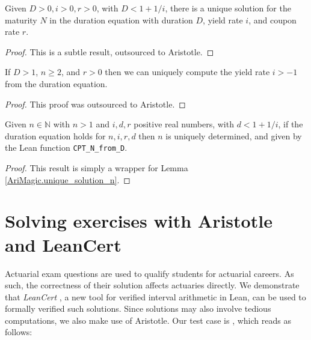 \begin{lemma}\label{AriMagic.unique_solution_n}
	\leanok
	Given $D>0, i>0, r>0$, with $D < 1 + 1/i$, there is a unique solution for the maturity $N$
	in the duration equation with duration $D$, yield rate $i$, and coupon rate $r$.
\end{lemma}
\begin{proof}
	\leanok
	This is a subtle result, outsourced to Aristotle.
\end{proof}

\begin{theorem}
	\label{eq_CPT_I_of_D}
	\leanok
	If $D>1$, $n \ge 2$, and $r > 0$ then we can uniquely
	compute the yield rate $i > -1$ from the duration equation.
\end{theorem}
\begin{proof}
\leanok
This proof was outsourced to Aristotle.
\end{proof}

\begin{theorem}
	\label{eq_CPT_N_of_D}
	\leanok
	
Given $n\in\mathbb N$ with $n>1$ and $i,d,r$ positive real numbers, with  $d < 1 + 1 / i$,
 if the duration equation holds for $n,i,r,d$ then $n$ is uniquely determined,
 and given by the Lean function \verb!CPT_N_from_D!.
\end{theorem}
\begin{proof}
	\leanok
	This result is simply a wrapper for Lemma \ref{AriMagic.unique_solution_n}.
\end{proof}

\section{Solving exercises with Aristotle and LeanCert}
Actuarial exam questions are used to qualify students for actuarial careers.
As such, the correctness of their solution affects actuaries directly.
We demonstrate that \emph{LeanCert} \cite{leancert}, a new tool for verified interval arithmetic in Lean,
can be used to formally verified such solutions. Since solutions may also involve tedious computations,
we also make use of Aristotle.
Our test case is \cite[Exercise 1.36]{ChanTse2021_finmath}, which reads as follows:

